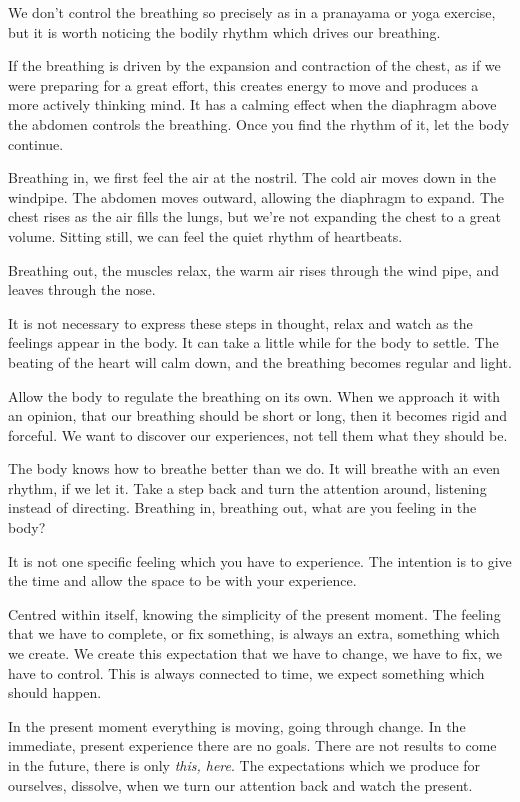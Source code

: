 We don't control the breathing so precisely as in a pranayama or yoga
exercise, but it is worth noticing the bodily rhythm which drives our
breathing.

If the breathing is driven by the expansion and contraction of the
chest, as if we were preparing for a great effort, this creates energy
to move and produces a more actively thinking mind. It has a calming
effect when the diaphragm above the abdomen controls the breathing. Once
you find the rhythm of it, let the body continue.

Breathing in, we first feel the air at the nostril. The cold air moves
down in the windpipe. The abdomen moves outward, allowing the diaphragm
to expand. The chest rises as the air fills the lungs, but we're not
expanding the chest to a great volume. Sitting still, we can feel the
quiet rhythm of heartbeats.

Breathing out, the muscles relax, the warm air rises through the wind
pipe, and leaves through the nose.

It is not necessary to express these steps in thought, relax and watch
as the feelings appear in the body. It can take a little while for the
body to settle. The beating of the heart will calm down, and the
breathing becomes regular and light.

Allow the body to regulate the breathing on its own. When we approach it
with an opinion, that our breathing should be short or long, then it
becomes rigid and forceful. We want to discover our experiences, not
tell them what they should be.

The body knows how to breathe better than we do. It will breathe with an
even rhythm, if we let it. Take a step back and turn the attention
around, listening instead of directing. Breathing in, breathing out,
what are you feeling in the body?

It is not one specific feeling which you have to experience. The
intention is to give the time and allow the space to be with your
experience.

Centred within itself, knowing the simplicity of the present moment. The
feeling that we have to complete, or fix something, is always an extra,
something which we create. We create this expectation that we have to
change, we have to fix, we have to control. This is always connected to
time, we expect something which should happen.

In the present moment everything is moving, going through change. In the
immediate, present experience there are no goals. There are not results
to come in the future, there is only \emph{this, here}. The expectations
which we produce for ourselves, dissolve, when we turn our attention
back and watch the present.

